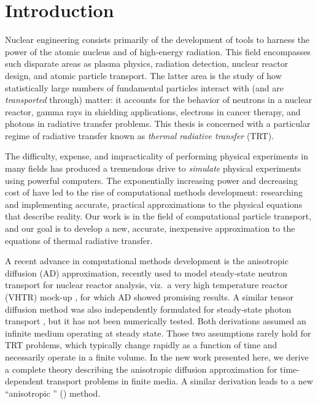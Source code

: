 
\chapter{Introduction}\label{chap:introduction}

Nuclear engineering consists primarily of the development of tools to harness
the power of the
atomic nucleus and of high-energy radiation. This field encompasses such
disparate areas as plasma physics, radiation detection, nuclear reactor design,
and atomic particle transport. The latter area is the study of how
statistically large numbers of fundamental particles interact with (and are
\emph{transported} through) matter: it
accounts for the behavior of neutrons in a nuclear reactor,
gamma rays in shielding applications, electrons in cancer therapy, and photons
in radiative transfer problems. This thesis is concerned with a
particular regime of radiative transfer known as \emph{thermal radiative
transfer} (TRT).

The difficulty, expense, and impracticality of performing physical
experiments in many fields has produced a tremendous drive to
\emph{simulate} physical experiments using powerful computers. The exponentially
increasing power and decreasing cost of have led to the rise of computational
methods development:
researching and implementing accurate, practical approximations to the physical
equations that describe reality. Our work is in the field of computational
particle transport, and our goal is to develop a new, accurate, inexpensive
approximation to the equations of thermal radiative transfer.

A recent advance in computational methods development is the anisotropic
diffusion (AD)
approximation, recently used to model steady-state neutron transport for
nuclear reactor analysis, viz.~a very high temperature reactor
(VHTR) mock-up \cite{Lar2009c,Tra2011}, for which AD showed promising
results. A similar tensor diffusion
method was also independently formulated for steady-state photon transport
\cite{Mor2007}, but it has not been numerically tested.
Both derivations assumed an infinite medium operating at steady state.
Those two assumptions rarely hold for TRT problems, which typically change
rapidly as a
function of time and necessarily operate in a finite volume. In the new
work presented here, we derive a complete theory describing the anisotropic
diffusion approximation for time-dependent transport problems in finite media.
A similar derivation leads to a new ``anisotropic \Pone'' (\APone) method.

